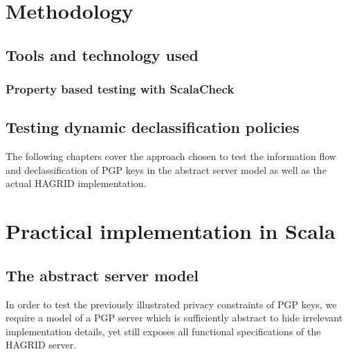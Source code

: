 \section{Methodology}
\subsection{Tools and technology used}
\newpage
\subsubsection{Property based testing with ScalaCheck}
\newpage
\subsection{Testing dynamic declassification policies}
The following chapters cover the approach chosen to test the information flow and declassification of PGP keys in the abstract server model as well as the actual HAGRID implementation. 

\section{Practical implementation in Scala}
\subsection{The abstract server model}
In order to test the previously illustrated privacy constraints of PGP keys, we require a model of a PGP server which is sufficiently abstract to hide irrelevant implementation details, yet still exposes all functional specifications of the HAGRID server.


